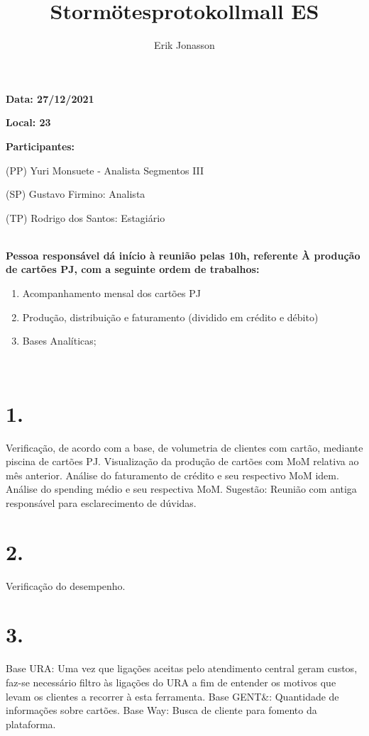 \documentclass[a4paper, 11pt]{article}
\title{Stormötesprotokollmall ES}
\author{Erik Jonasson}
\begin{document}
\pagestyle{style1}

\textbf{Data: 27/12/2021} %

\textbf{Local: 23} %

\textbf{Participantes:} 
\begin{description}
\item (PP) Yuri Monsuete - Analista Segmentos III
\item (SP) Gustavo Firmino: Analista 
\item (TP) Rodrigo dos Santos: Estagiário
\end{description}

\makebox[\linewidth]{\rule{\linewidth}{0.4pt}}\\
\textbf{Pessoa responsável dá início à reunião pelas 10h, referente À produção de cartões PJ, com a seguinte ordem de trabalhos:} 
\begin{enumerate}
\item Acompanhamento mensal dos cartões PJ


\item Produção, distribuição e faturamento (dividido em crédito e débito)
\item Bases Analíticas;




\end{enumerate}
\makebox[\linewidth]{\rule{\linewidth}{0.4pt}}\\

\section*{1.}
Verificação, de acordo com a base, de volumetria de clientes com cartão, mediante piscina de cartões PJ. Visualização da produção de cartões com MoM relativa ao mês anterior. Análise  do faturamento de crédito e seu respectivo MoM idem. Análise do spending médio e seu respectiva MoM.
Sugestão: Reunião com antiga responsável para esclarecimento de dúvidas.


\section*{2. }
Verificação do desempenho.

\section*{3.}
Base URA: Uma vez que ligações aceitas pelo atendimento central geram custos, faz-se necessário filtro às ligações do URA a fim de entender os motivos que levam os clientes a recorrer à esta ferramenta. 
Base GENT&: Quantidade de informações sobre cartões.
Base Way: Busca de cliente para fomento da plataforma.
 
\end{document}
